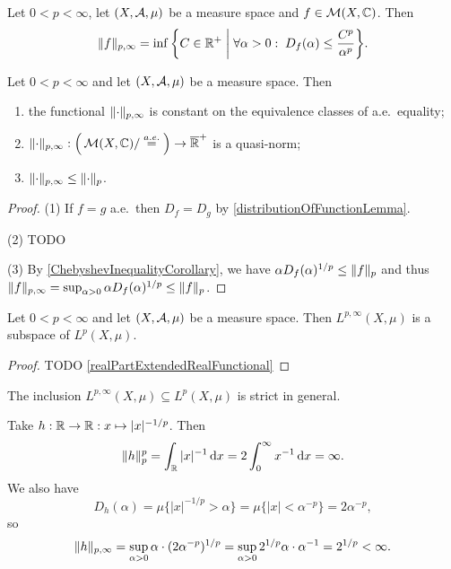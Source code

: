 \begin{lemma}
Let $0<p<\infty$, let $\sSet{X,\mathcal{A}, \mu}$ be a measure space and $f\in \operatorname{\mathcal{M}}(X, \mathbb{C})$. Then
\[ \norm{f}_{p,\infty} = \inf\setbuilder{C\in \R^+}{\forall \alpha>0: \; D_f(\alpha) \leq \frac{C^p}{\alpha^p}}. \]
\end{lemma}


\begin{proposition}
Let $0<p<\infty$ and let $\sSet{X,\mathcal{A}, \mu}$ be a measure space. Then
\begin{enumerate}
\item the functional $\lVert\cdot\rVert_{p,\infty}$ is constant on the equivalence classes of a.e.\ equality;
\item $\lVert\cdot\rVert_{p,\infty}: \Big(\operatorname{\mathcal{M}}(X, \mathbb{C})/\overset{a.e.}{=}\Big) \to \overline{\mathbb{R}}^+$ is a quasi-norm;
\item $\lVert\cdot\rVert_{p,\infty} \leq \lVert\cdot\rVert_{p}$.
\end{enumerate}
\end{proposition}
\begin{proof}
(1) If $f = g$ a.e.\ then $D_f = D_g$ by \ref{distributionOfFunctionLemma}.

(2) TODO

(3) By \ref{ChebyshevInequalityCorollary}, we have $\alpha D_f(\alpha)^{1/p} \leq \lVert f\rVert_p$ and thus $\lVert f\rVert_{p,\infty} = \sup_{\alpha > 0}\alpha D_f(\alpha)^{1/p} \leq \lVert f\rVert_p$.
\end{proof}
\begin{corollary}
Let $0<p<\infty$ and let $\sSet{X,\mathcal{A}, \mu}$ be a measure space. Then $L^{p,\infty}(X,\mu)$ is a subspace of $L^{p}(X,\mu)$.
\end{corollary}
\begin{proof}
TODO \ref{realPartExtendedRealFunctional}
\end{proof}

\begin{example}
The inclusion $L^{p,\infty}(X,\mu) \subseteq L^{p}(X,\mu)$ is strict in general.

Take $h: \mathbb{R}\to \mathbb{R}: x\mapsto |x|^{-1/p}$. Then
\[ \lVert h\rVert_p^p = \int_{\mathbb{R}} |x|^{-1} \operatorname{d \!}{x} = 2\int_0^\infty x^{-1}\operatorname{d \!}{x} = \infty. \]
We also have
\[ D_h(\alpha) = \mu\big\{|x|^{-1/p} > \alpha\big\} = \mu\big\{|x| < \alpha^{-p}\big\} = 2\alpha^{-p}, \]
so
\[ \lVert h\rVert_{p,\infty} = \sup_{\alpha > 0}\alpha\cdot (2\alpha^{-p})^{1/p} = \sup_{\alpha > 0}2^{1/p}\alpha\cdot \alpha^{-1} = 2^{1/p} < \infty. \]
\end{example}

